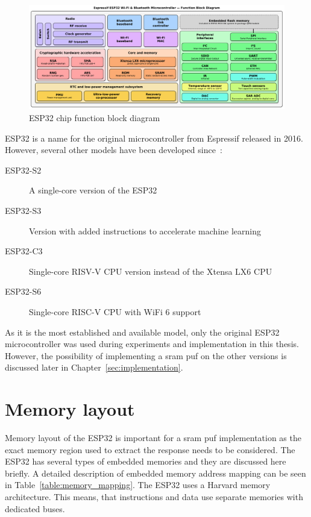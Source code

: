 \begin{figure}[ht!]
    \centering
    \captionsetup{justification=centering,margin=0.5cm}
    \includegraphics[width=\textwidth]{images/esp32_diagram.pdf}
    \caption[ESP32 chip function block diagram]{ESP32 chip function block diagram~\cite{Krent2018}}
    \label{fig:esp32_diagram}
\end{figure}

ESP32 is a name for the original microcontroller from Espressif released in 2016. However, several other models have been developed since~\cite{espidf2022}:

\begin{description}
    \item[ESP32-S2] A single-core version of the ESP32
    \item[ESP32-S3] Version with added instructions to accelerate machine learning
    \item[ESP32-C3] Single-core RISV-V CPU version instead of the Xtensa LX6 CPU
    \item[ESP32-S6] Single-core RISC-V CPU with WiFi 6 support
\end{description}

As it is the most established and available model, only the original ESP32 microcontroller was used during experiments and implementation in this thesis. However, the possibility of implementing a \gls{sram} \gls{puf} on the other versions is discussed later in Chapter~\ref{sec:implementation}.

\section{Memory layout}\label{sec:memory_layout}

Memory layout of the ESP32 is important for a \gls{sram} \gls{puf} implementation as the exact memory region used to extract the response needs to be considered. The ESP32 has several types of embedded memories and they are discussed here briefly. A detailed description of embedded memory address mapping can be seen in Table~\ref{table:memory_mapping}. The ESP32 uses a Harvard memory architecture. This means, that instructions and data use separate memories with dedicated buses.~\cite{esp322021}

